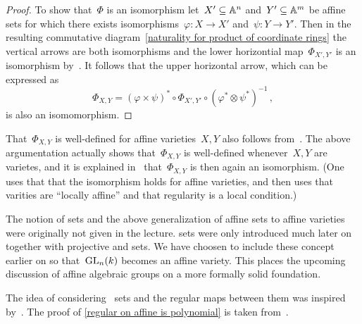 \begin{proof}
  
  To show that~$\Phi$ is an isomorphism let~$X' \subseteq \mathbb{A}^n$ and~$Y' \subseteq \mathbb{A}^m$ be affine sets for which there exists isomorphisms~$\varphi \colon X \to X'$ and~$\psi \colon Y \to Y'$.
  Then in the resulting commutative diagram~\eqref{naturality for product of coordinate rings} the vertical arrows are both isomorphisms and the lower horizontial map~$\Phi_{X', Y'}$ is an isomorphism by~.
  It follows that the upper horizontal arrow, which can be expressed as
  \begin{equation}
  \label{isomorphism for affine varieties}
      \Phi_{X,Y}
    = (\varphi \times \psi)^* \circ \Phi_{X',Y'} \circ ( \varphi^* \otimes \psi^* )^{-1} \,,
  \end{equation}
  is also an isomomorphism.
\end{proof}


\begin{remark}
  That~$\Phi_{X,Y}$ is well-defined for affine varieties~$X,Y$ also follows from~.
  The above argumentation actually shows that~$\Phi_{X,Y}$ is well-defined whenever~$X,Y$ are {\qaffine} varietes, and it is explained in~\cite{MO267198} that~$\Phi_{X,Y}$ is then again an isomorphism.
  (One uses that that the isomorphism holds for affine varieties, and then uses that {\qaffine} varities are \enquote{locally affine} and that regularity is a local condition.)
\end{remark}




\begin{fluff}
  The notion of {\qaffine} sets and the above generalization of affine sets to affine varieties were originally not given in the lecture.
  {\Qaffine} sets were only introduced much later on together with projective and {\qprojective} sets.
  We have choosen to include these concept earlier on so that~$\operatorname{GL}_n(k)$ becomes an affine variety.
  This places the upcoming discussion of affine algebraic groups on a more formally solid foundation.
  
  The idea of considering~{\qaffine} sets and the regular maps between them was inspired by~\cite[2.2]{frankeAlg1}.
  The proof of \cref{regular on affine is polynomial} is taken from~\cite[Lemma~3.10]{milneAG}.
\end{fluff}







